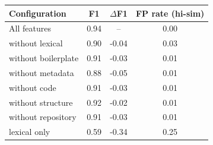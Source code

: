 \begin{tabular}{lccc}
\toprule
Configuration & F1 & $\Delta$F1 & FP rate (hi-sim) \\
\midrule
All features & 0.94 & -- & 0.00 \\
without lexical & 0.90 & -0.04 & 0.03 \\
without boilerplate & 0.91 & -0.03 & 0.01 \\
without metadata & 0.88 & -0.05 & 0.01 \\
without code & 0.91 & -0.03 & 0.01 \\
without structure & 0.92 & -0.02 & 0.01 \\
without repository & 0.91 & -0.03 & 0.01 \\
lexical only & 0.59 & -0.34 & 0.25 \\
\bottomrule
\end{tabular}
